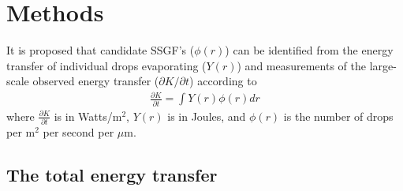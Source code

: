 \documentclass[10pt,a4paper]{article}
\begin{document}
\section{Methods}
It is proposed that  candidate SSGF's ($\phi(r)$) can be identified from the energy transfer of individual drops evaporating ($Y(r)$) and measurements of the large-scale observed energy transfer ($\partial K /\partial t$) according to
\begin{align}
\frac{\partial K}{\partial t} = \int Y(r)\phi(r) dr\label{eq:Kdt}
\end{align}
where $\frac{\partial K}{\partial t}$ is in Watts/m$^2$, $Y(r)$ is in Joules, and $\phi(r)$ is the number of drops per m$^2$ per second per $\mu$m.\par 

\subsection{The total energy transfer}
\end{document}
